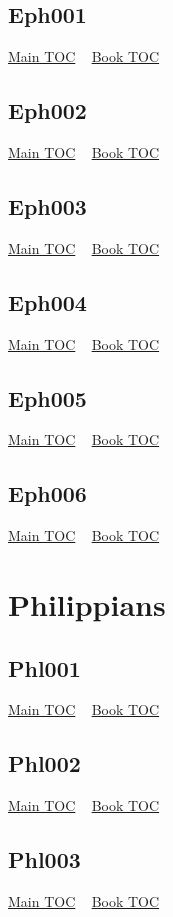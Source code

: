 \documentclass{book}
\begin{document}
  \section{Eph001}\hyperlink{toc}{Main TOC} ~ \hyperref[subsec:Eph]{Book TOC} 
  \section{Eph002}\hyperlink{toc}{Main TOC} ~ \hyperref[subsec:Eph]{Book TOC} 
  \section{Eph003}\hyperlink{toc}{Main TOC} ~ \hyperref[subsec:Eph]{Book TOC} 
  \section{Eph004}\hyperlink{toc}{Main TOC} ~ \hyperref[subsec:Eph]{Book TOC} 
  \section{Eph005}\hyperlink{toc}{Main TOC} ~ \hyperref[subsec:Eph]{Book TOC} 
  \section{Eph006}\hyperlink{toc}{Main TOC} ~ \hyperref[subsec:Eph]{Book TOC} 
  \chapter{Philippians} \label{subsec:Phl} \begin{multicols}{2} \minitoc \end{multicols}
  \section{Phl001}\hyperlink{toc}{Main TOC} ~ \hyperref[subsec:Phl]{Book TOC} 
  \section{Phl002}\hyperlink{toc}{Main TOC} ~ \hyperref[subsec:Phl]{Book TOC} 
  \section{Phl003}\hyperlink{toc}{Main TOC} ~ \hyperref[subsec:Phl]{Book TOC} 
\end{document}
